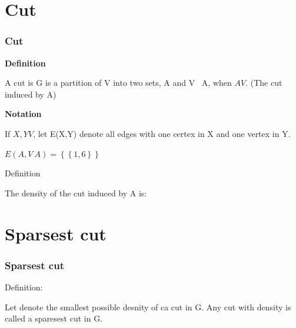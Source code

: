 \documentclass{beamer}
\begin{document}
\section{Cut}
\begin{frame}
\frametitle{\textbf{Cut} }
\textbf{Definition} \vspace{0.2 cm}

A cut is G is a partition of V into two sets, A and V \ A, when $A V$. (The cut induced by A)

\textbf{Notation} \vspace{0.2 cm}

If $X,Y V$, let E(X,Y) denote all edges with one certex in X and one vertex in Y.

$E(A, V \ A) = \left\{ \left\{1,6\right\} \right\}$


Definition

The density of the cut induced by A is:



\end{frame}


\section{Sparsest cut}
\begin{frame}
\frametitle{\textbf{Sparsest cut} }
Definition: \vspace{0.2 cm}

Let denote the smallest possible desnity of ca cut in G. Any cut with density is called a sparesest cut in G.

\end{frame}

\end{document}
